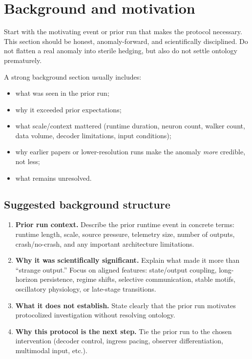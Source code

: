 \documentclass[11pt]{article}
\begin{document}
\section{Background and motivation}

Start with the motivating event or prior run that makes the protocol necessary. This section should be honest, anomaly-forward, and scientifically disciplined. Do not flatten a real anomaly into sterile hedging, but also do not settle ontology prematurely.

A strong background section usually includes:
\begin{itemize}[leftmargin=1.5em]
  \item what was seen in the prior run;
  \item why it exceeded prior expectations;
  \item what scale/context mattered (runtime duration, neuron count, walker count, data volume, decoder limitations, input conditions);
  \item why earlier papers or lower-resolution runs make the anomaly \emph{more} credible, not less;
  \item what remains unresolved.
\end{itemize}

\subsection{Suggested background structure}

\begin{enumerate}[leftmargin=1.5em]
  \item \textbf{Prior run context.} Describe the prior runtime event in concrete terms: runtime length, scale, source pressure, telemetry size, number of outputs, crash/no-crash, and any important architecture limitations.
  \item \textbf{Why it was scientifically significant.} Explain what made it more than ``strange output.'' Focus on aligned features: state/output coupling, long-horizon persistence, regime shifts, selective communication, stable motifs, oscillatory physiology, or late-stage transitions.
  \item \textbf{What it does not establish.} State clearly that the prior run motivates protocolized investigation without resolving ontology.
  \item \textbf{Why this protocol is the next step.} Tie the prior run to the chosen intervention (decoder control, ingress pacing, observer differentiation, multimodal input, etc.).
\end{enumerate}
\end{document}
